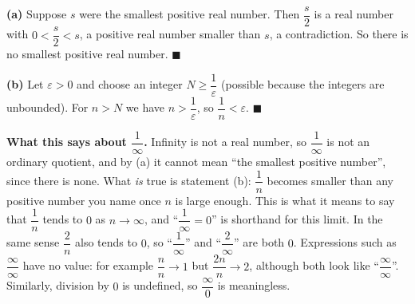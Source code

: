 \textbf{(a)} Suppose $s$ were the smallest positive real number. Then $\dfrac {s}{2}$ is a real number with $0<\dfrac {s}{2}<s$, a positive real number smaller than $s$, a contradiction. So there is no smallest positive real number. $\blacksquare$

\textbf{(b)} Let $\varepsilon>0$ and choose an integer $N\ge\dfrac{1}{\varepsilon}$ (possible because the integers are unbounded). For $n>N$ we have $n>\dfrac{1}{\varepsilon}$, so $\dfrac{1}{n}<\varepsilon$. $\blacksquare$

\textbf{What this says about $\dfrac{1}{\infty}$.} Infinity is not a real number, so $\dfrac{1}{\infty}$ is not an ordinary quotient, and by (a) it cannot mean ``the smallest positive number'', since there is none. What \emph{is} true is statement (b): $\dfrac{1}{n}$ becomes smaller than any positive number you name once $n$ is large enough. This is what it means to say that $\dfrac{1}{n}$ tends to $0$ as $n\to\infty$, and ``$\dfrac{1}{\infty}=0$'' is shorthand for this limit. In the same sense $\dfrac{2}{n}$ also tends to $0$, so ``$\dfrac{1}{\infty}$'' and ``$\dfrac{2}{\infty}$'' are both $0$. Expressions such as $\dfrac{\infty}{\infty}$ have no value: for example $\dfrac{n}{n}\to1$ but $\dfrac{2n}{n}\to2$, although both look like ``$\dfrac{\infty}{\infty}$''. Similarly, division by $0$ is undefined, so $\dfrac{\infty}{0}$ is meaningless.
